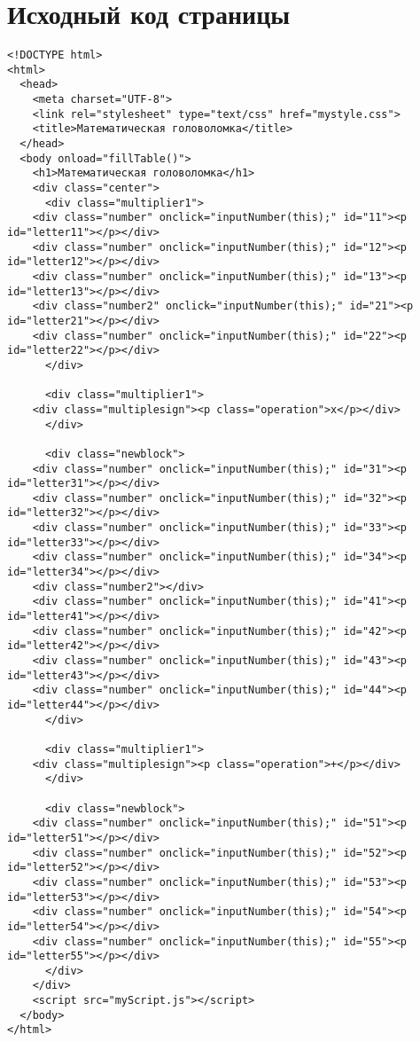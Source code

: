 \section{Исходный код страницы}

\begin{lstlisting}[caption=index.html]
<!DOCTYPE html>
<html>
  <head>
    <meta charset="UTF-8">
    <link rel="stylesheet" type="text/css" href="mystyle.css">
    <title>Математическая головоломка</title>
  </head>
  <body onload="fillTable()">
    <h1>Математическая головоломка</h1>
    <div class="center">
      <div class="multiplier1">
	<div class="number" onclick="inputNumber(this);" id="11"><p id="letter11"></p></div>
	<div class="number" onclick="inputNumber(this);" id="12"><p id="letter12"></p></div>
	<div class="number" onclick="inputNumber(this);" id="13"><p id="letter13"></p></div>
	<div class="number2" onclick="inputNumber(this);" id="21"><p id="letter21"></p></div>
	<div class="number" onclick="inputNumber(this);" id="22"><p id="letter22"></p></div>
      </div>
      
      <div class="multiplier1">
	<div class="multiplesign"><p class="operation">x</p></div>
      </div>
      
      <div class="newblock">
	<div class="number" onclick="inputNumber(this);" id="31"><p id="letter31"></p></div>
	<div class="number" onclick="inputNumber(this);" id="32"><p id="letter32"></p></div>
	<div class="number" onclick="inputNumber(this);" id="33"><p id="letter33"></p></div>
	<div class="number" onclick="inputNumber(this);" id="34"><p id="letter34"></p></div>
	<div class="number2"></div>
	<div class="number" onclick="inputNumber(this);" id="41"><p id="letter41"></p></div>
	<div class="number" onclick="inputNumber(this);" id="42"><p id="letter42"></p></div>
	<div class="number" onclick="inputNumber(this);" id="43"><p id="letter43"></p></div>
	<div class="number" onclick="inputNumber(this);" id="44"><p id="letter44"></p></div>
      </div>
      
      <div class="multiplier1">
	<div class="multiplesign"><p class="operation">+</p></div>
      </div>

      <div class="newblock">
	<div class="number" onclick="inputNumber(this);" id="51"><p id="letter51"></p></div>
	<div class="number" onclick="inputNumber(this);" id="52"><p id="letter52"></p></div>
	<div class="number" onclick="inputNumber(this);" id="53"><p id="letter53"></p></div>
	<div class="number" onclick="inputNumber(this);" id="54"><p id="letter54"></p></div>
	<div class="number" onclick="inputNumber(this);" id="55"><p id="letter55"></p></div>
      </div>
    </div>
    <script src="myScript.js"></script>
  </body>
</html>
\end{lstlisting}

